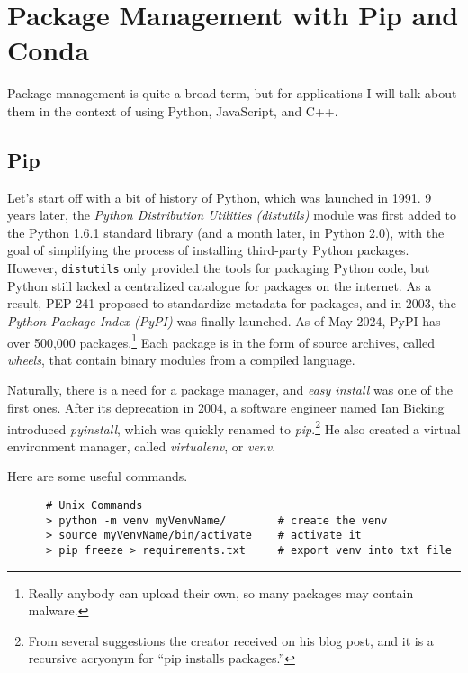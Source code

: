 \section{Package Management with Pip and Conda} 

  Package management is quite a broad term, but for applications I will talk about them in the context of using Python, JavaScript, and C++. 

\subsection{Pip} 

  Let's start off with a bit of history of Python, which was launched in 1991. 9 years later, the \textit{Python Distribution Utilities (distutils)} module was first added to the Python 1.6.1 standard library (and a month later, in Python 2.0), with the goal of simplifying the process of installing third-party Python packages. However, \texttt{distutils} only provided the tools for packaging Python code, but Python still lacked a centralized catalogue for packages on the internet. As a result, PEP 241 proposed to standardize metadata for packages, and in 2003, the \textit{Python Package Index (PyPI)} was finally launched. As of May 2024, PyPI has over 500,000 packages.\footnote{Really anybody can upload their own, so many packages may contain malware.} Each package is in the form of source archives, called \textit{wheels}, that contain binary modules from a compiled language. 

  Naturally, there is a need for a package manager, and \textit{easy install} was one of the first ones. After its deprecation in 2004, a software engineer named Ian Bicking introduced \textit{pyinstall}, which was quickly renamed to \textit{pip}.\footnote{From several suggestions the creator received on his blog post, and it is a recursive acryonym for ``pip installs packages.''} He also created a virtual environment manager, called \textit{virtualenv}, or \textit{venv}. 

  \begin{example}
    Here are some useful commands. 
    \begin{lstlisting}
      # Unix Commands
      > python -m venv myVenvName/        # create the venv
      > source myVenvName/bin/activate    # activate it  
      > pip freeze > requirements.txt     # export venv into txt file 
    \end{lstlisting}
  \end{example}

